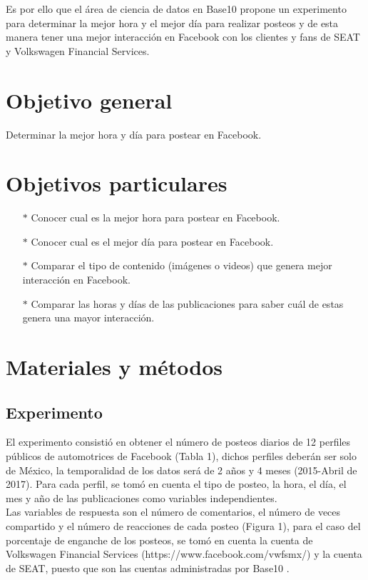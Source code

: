 \documentclass[a4paper,10pt]{article}
\begin{document}
Es por ello que el área de ciencia de datos en Base10 propone un experimento
para determinar la mejor hora y el mejor día para realizar posteos y de esta manera
tener una mejor interacción en Facebook con los clientes y fans de SEAT y Volkswagen Financial Services.


\section{Objetivo general}
Determinar la mejor hora y día para postear en Facebook.

\section{Objetivos particulares}
  \begin{itemize}
   \item[$*$] Conocer cual es la  mejor hora para postear en Facebook.
   \item[$*$] Conocer cual es el mejor día para postear en Facebook.
   \item[$*$] Comparar el tipo de contenido (imágenes o videos) que genera mejor interacción en Facebook.
   \item[$*$] Comparar las horas y días de las publicaciones para saber cuál de estas genera una  mayor interacción.
  \end{itemize}


\section{Materiales y métodos}
\subsection{Experimento}
El experimento consistió en obtener el número de posteos diarios de 12 perfiles
públicos de automotrices de Facebook (Tabla 1), dichos perfiles deberán ser solo de México, 
la temporalidad de los datos será de  2 años y 4 meses (2015-Abril de 2017).
Para cada perfil, se tomó en cuenta el tipo de posteo, la hora, el día, el mes y año de 
las publicaciones como variables independientes.\\
Las variables de respuesta son el número de comentarios,
el número de veces compartido y el número de reacciones de cada posteo (Figura 1),
para el caso del porcentaje de enganche de los posteos, se tomó en cuenta
la cuenta de Volkswagen Financial Services (https://www.facebook.com/vwfsmx/)
y la cuenta de SEAT, puesto que son las cuentas administradas por Base10 .
\end{document}
